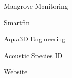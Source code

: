 \item Mangrove Monitoring
\item Smartfin
\item Aqua3D Engineering
\item Acoustic Species ID
\item Website
